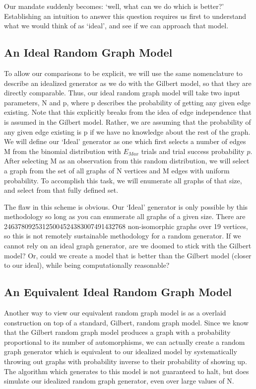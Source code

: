 Our mandate suddenly becomes: `well, what can we do which is better?'
Establishing an intuition to answer this question requires us first to understand what we would think of as `ideal', and see if we can approach that model.

\subsection{An Ideal Random Graph Model}
To allow our comparisons to be explicit, we will use the same nomenclature to describe an idealized generator as we do with the Gilbert model, so that they are directly comparable.
Thus, our ideal random graph model will take two input parameters, N and p, where p describes the probability of getting any given edge existing.
Note that this explicitly breaks from the idea of edge independence that is assumed in the Gilbert model.
Rather, we are assuming that the probability of any given edge existing is p if we have no knowledge about the rest of the graph.
We will define our `Ideal' generator as one which first selects a number of edges M from the binomial distribution with $E_{Max}$ trials and trial success probability $p$.
After selecting M as an observation from this random distribution, we will select a graph from the set of all graphs of N vertices and M edges with uniform probability.
To accomplish this task, we will enumerate all graphs of that size, and select from that fully defined set.

The flaw in this scheme is obvious.
Our `Ideal' generator is only possible by this methodology so long as you can enumerate all graphs of a given size.
There are 24637809253125004524383007491432768 non-isomorphic graphs over 19 vertices, so this is not remotely sustainable methodology for a random generator.
If we cannot rely on an ideal graph generator, are we doomed to stick with the Gilbert model?
Or, could we create a model that is better than the Gilbert model (closer to our ideal), while being computationally reasonable?

\subsection{An Equivalent Ideal Random Graph Model}

Another way to view our equivalent random graph model is as a overlaid construction on top of a standard, Gilbert, random graph model.
Since we know that the Gilbert random graph model produces a graph with a probability proportional to its number of automorphisms, we can actually create a random graph generator which is equivalent to our idealized model by systematically throwing out graphs with probability inverse to their probability of showing up.
The algorithm which generates to this model is not guaranteed to halt, but does simulate our idealized random graph generator, even over large values of N.

